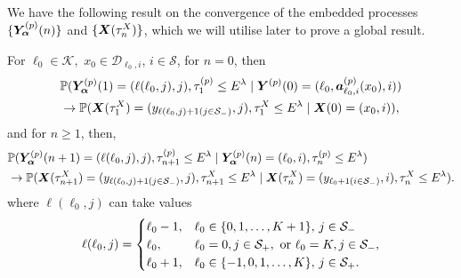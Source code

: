 We have the following result on the convergence of the embedded processes \(\{\bm{Y}_{\bm{\alpha}}^{(p)}(n)\}\) and \(\{\boldsymbol X(\tau_n^X)\}\), which we will utilise later to prove a global result.
\begin{cor}\label{cor: aln222222} For \(\ell_0\in\mathcal K,\) \(x_0\in\mathcal D_{\ell_0,i}\), \(i\in\mathcal S\), 
	for \(n=0\), then
	\begin{align}
		&\mathbb P(\bm{Y}_{\bm{\alpha}}^{(p)}(1) = (\ell(\ell_0,j),j), \tau_1^{(p)}\leq E^\lambda
            	 \mid \boldsymbol Y^{(p)}(0) = (\ell_0,\boldsymbol a_{\ell_0,i}^{(p)}(x_0),i)) \nonumber
		\\&\to  
			\mathbb P(\boldsymbol X(\tau_1^X) = (y_{\ell(\ell_0,j)+1(j\in\mathcal{S}_-)}, j), \tau_1^{X}\leq E^\lambda \mid \boldsymbol X(0) = (x_0,i)),\label{eqn: lim 1}
	\end{align}
	and for \(n\geq 1\), then, 
	\begin{align}
		&\mathbb P(\bm{Y}_{\bm{\alpha}}^{(p)}(n+1) = (\ell(\ell_0,j),j), \tau_{n+1}^{(p)}\leq E^\lambda
            	 \mid \bm{Y}_{\bm{\alpha}}^{(p)}(n) = (\ell_0,i), \tau_n^{(p)}\leq E^\lambda) \nonumber
		\\&\to  
			\mathbb P(\boldsymbol X(\tau_{n+1}^X) = (y_{\ell(\ell_0,j)+1(j\in\mathcal{S}_-)}, j), \tau_{n+1}^{X}\leq E^\lambda \mid \boldsymbol X(\tau_{n}^X) = (y_{\ell_0+1(i\in\mathcal{S}_-)},i), \tau_n^{X}\leq E^\lambda).\label{eqn: ddddddd}
	\end{align}
	where \(\ell(\ell_0,j)\) can take values
	\begin{align}
		\ell(\ell_0,j) = \begin{cases}
			\ell_0-1, & \ell_0\in\{0,1,\dots,K+1\},\, j\in\mathcal{S}_-\\
			\ell_0, & \ell_0 = 0, j\in\mathcal S_+, \mbox{ or }\ell_0 = K, j\in\mathcal S_-,\\
			\ell_0+1, & \ell_0\in\{-1,0,1,\dots,K\},\, j\in\mathcal{S}_+.
		\end{cases}
	\end{align}
\end{cor}

